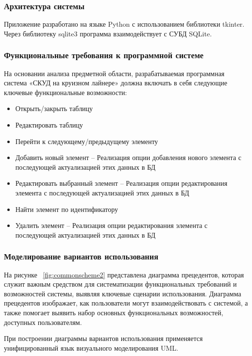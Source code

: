 \subsubsection{Архитектура системы}

Приложение разработано на языке Python с использованием библиотеки tkinter. Через библиотеку sqlite3 программа взаимодействует с СУБД SQLite.

\subsubsection{Функциональные требования к программной системе}

На основании анализа предметной области, разрабатываемая программная система «СКУД на круизном лайнере» должна включать в себя следующие ключевые функциональные возможности:
\begin{itemize}
	\item Открыть/закрыть таблицу
	\item Редактировать таблицу
	\item Перейти к следующему/предыдущему элементу
	\item Добавить новый элемент -- Реализация опции добавления нового элемента с последующей актуализацией этих данных в БД 
	\item Редактировать выбранный элемент -- Реализация опции редактирования элемента с последующей актуализацией этих данных в БД 
	\item Найти элемент по идентификатору
	\item Удалить элемент -- Реализация опции редактирования элемента с последующей актуализацией этих данных в БД 
\end{itemize}

\subsubsection{Моделирование вариантов использования}

На рисунке  ~\ref{fig:commonscheme2} представлена диаграмма прецедентов, которая служит важным средством для систематизации функциональных требований и возможностей системы, выявляя ключевые сценарии использования. Диаграмма прецедентов изображает, как пользователи могут взаимодействовать с системой, а также помогает выявить набор основных функциональных возможностей, доступных пользователям.

При построении диаграммы вариантов использования применяется унифицированный язык визуального моделирования UML.

